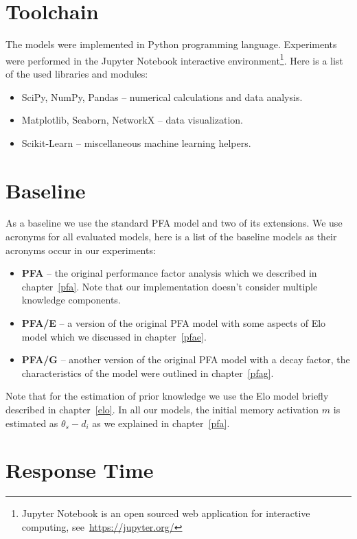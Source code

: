 \section{Toolchain}

The models were implemented in Python programming language. Experiments were performed in the Jupyter Notebook interactive environment\footnote{Jupyter Notebook is an open sourced web application for interactive computing, see~\url{https://jupyter.org/}}. Here is a list of the used libraries and modules:

\begin{itemize}
  \item SciPy, NumPy, Pandas -- numerical calculations and data analysis.
  \item Matplotlib, Seaborn, NetworkX -- data visualization.
  \item Scikit-Learn -- miscellaneous machine learning helpers.
\end{itemize}

\section{Baseline}

As a baseline we use the standard PFA model and two of its extensions. We use acronyms for all evaluated models, here is a list of the baseline models as their acronyms occur in our experiments:

\begin{itemize}
  \item \textbf{PFA} -- the original performance factor analysis which we described in chapter~\ref{pfa}. Note that our implementation doesn't consider multiple knowledge components.
  \item \textbf{PFA/E} -- a version of the original PFA model with some aspects of Elo model which we discussed in chapter~\ref{pfae}.
  \item \textbf{PFA/G} -- another version of the original PFA model with a decay factor, the characteristics of the model were outlined in chapter~\ref{pfag}.
\end{itemize}

Note that for the estimation of prior knowledge we use the Elo model briefly described in chapter~\ref{elo}. In all our models, the initial memory activation $m$ is estimated as $\theta_s - d_i$ as we explained in chapter~\ref{pfa}.

\section{Response Time}

